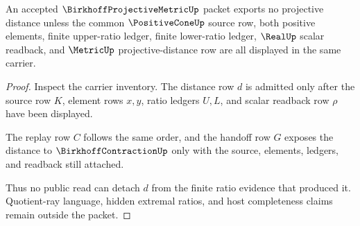 \begin{theorem}\label{thm:birkhoff-projective-metric-ratio-nonescape}
An accepted $\BirkhoffProjectiveMetricUp$ packet exports no projective distance unless the common $\PositiveConeUp$ source row, both positive elements, finite upper-ratio ledger, finite lower-ratio ledger, $\RealUp$ scalar readback, and $\MetricUp$ projective-distance row are all displayed in the same carrier.
\end{theorem}
\begin{proof}
Inspect the carrier inventory. The distance row $d$ is admitted only after the source row $K$, element rows $x,y$, ratio ledgers $U,L$, and scalar readback row $\rho$ have been displayed.

The replay row $C$ follows the same order, and the handoff row $G$ exposes the distance to $\BirkhoffContractionUp$ only with the source, elements, ledgers, and readback still attached.

Thus no public read can detach $d$ from the finite ratio evidence that produced it. Quotient-ray language, hidden extremal ratios, and host completeness claims remain outside the packet.
\end{proof}




